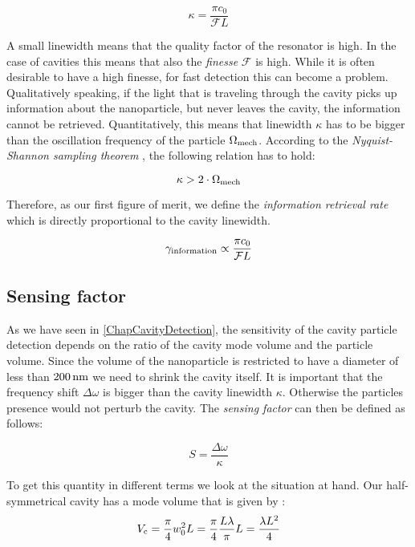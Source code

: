 \begin{equation}
	\kappa = \frac{\pi c_0}{\mathcal{F}L}
\end{equation}

A small linewidth means that the quality factor of the resonator is high. In the case of cavities this means that also the \textit{finesse} $\mathcal{F}$ is high. While it is often desirable to have a high finesse, for fast detection this can become a problem. Qualitatively speaking, if the light that is traveling through the cavity picks up information about the nanoparticle, but never leaves the cavity, the information cannot be retrieved. Quantitatively, this means that linewidth $\kappa$ has to be bigger than the oscillation frequency of the particle $\de{\Omega}{mech}$. According to the \textit{Nyquist-Shannon sampling theorem} \cite{shannon1949communication}, the following relation has to hold:

\begin{equation}
	\kappa > 2\cdot\de{\Omega}{mech}
\end{equation}

Therefore, as our first figure of merit, we define the \textit{information retrieval rate} which is directly proportional to the cavity linewidth.

\begin{equation}
	\de{\gamma}{information}\propto \frac{\pi c_0}{\mathcal{F}L}
\end{equation}

\subsection{Sensing factor}\label{ChapSensingFactor}
As we have seen in \autoref{ChapCavityDetection}, the sensitivity of the cavity particle detection depends on the ratio of the cavity mode volume and the particle volume. Since the volume of the nanoparticle is restricted to have a diameter of less than $200\nm$ we need to shrink the cavity itself. It is important that the frequency shift $\Delta\omega$ is bigger than the cavity linewidth $\kappa$. Otherwise the particles presence would not perturb the cavity. The \textit{sensing factor} can then be defined as follows:

\begin{equation}\label{EqS}
	S=\frac{\Delta\omega}{\kappa}
\end{equation}

To get this quantity in different terms we look at the situation at hand. Our half-symmetrical cavity has a mode volume that is given by \cite[p.~752]{siegman1986lasers}:
\begin{equation}
	\de{V}{c}=\frac{\pi}{4}w_0^2L=\frac{\pi}{4}\frac{L\lambda}{\pi}L=\frac{\lambda L^2}{4}
\end{equation}

